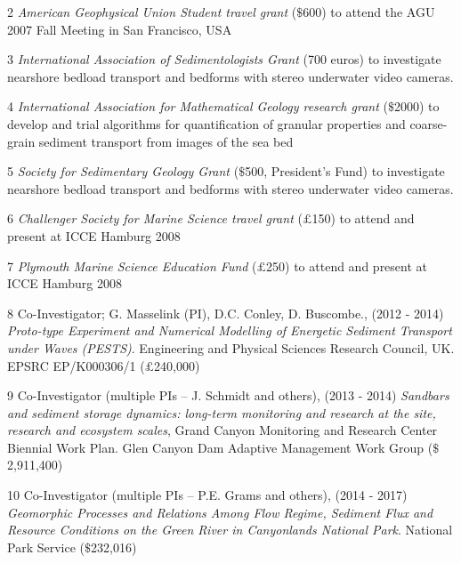 \documentclass[margin,line]{resume}
\begin{document}
\begin{resume}
\begin{footnotesize}
\begin{list1}
	\item[2] {\sl American Geophysical Union Student travel grant} ($\$$600) to attend the AGU 2007 Fall Meeting in San Francisco, USA\\
	
	\item[3] {\sl International Association of Sedimentologists Grant} (700 euros) to investigate nearshore bedload transport and bedforms with stereo underwater video cameras.\\
	
	\item[4] {\sl International Association for Mathematical Geology research grant} ($\$$2000) to develop and trial algorithms for quantification of granular properties and coarse-grain sediment transport from images of the sea bed\\
	
	\item[5] {\sl Society for Sedimentary Geology Grant} ($\$$500, President's Fund) to investigate nearshore bedload transport and bedforms with stereo underwater video cameras.\\
	
	\item[6] {\sl Challenger Society for Marine Science travel grant} ($\pounds$150) to attend and present at ICCE Hamburg 2008\\
	
	\item[7] {\sl Plymouth Marine Science Education Fund} ($\pounds$250) to attend and present at ICCE Hamburg 2008\\

	\item[8] Co-Investigator; G. Masselink (PI), D.C. Conley, D. Buscombe., (2012 - 2014) {\sl Proto-type Experiment and Numerical Modelling of Energetic Sediment Transport under Waves (PESTS)}. Engineering and Physical Sciences Research Council, UK. EPSRC EP/K000306/1 ($\pounds$240,000)\\

	\item[9] Co-Investigator (multiple PIs – J. Schmidt and others), (2013 - 2014) {\sl Sandbars and sediment storage dynamics: long-term monitoring and research at the site, research and ecosystem scales}, Grand Canyon Monitoring and Research Center Biennial Work Plan. Glen Canyon Dam Adaptive Management Work Group ($\$$2,911,400)\\

	\item[10] Co-Investigator (multiple PIs – P.E. Grams and others), (2014 - 2017) {\sl Geomorphic Processes and Relations Among Flow Regime, Sediment Flux and Resource Conditions on the Green River in Canyonlands National Park}. National Park Service ($\$$232,016)\\


\end{list1}
\end{footnotesize}
\end{resume}
\end{document}
